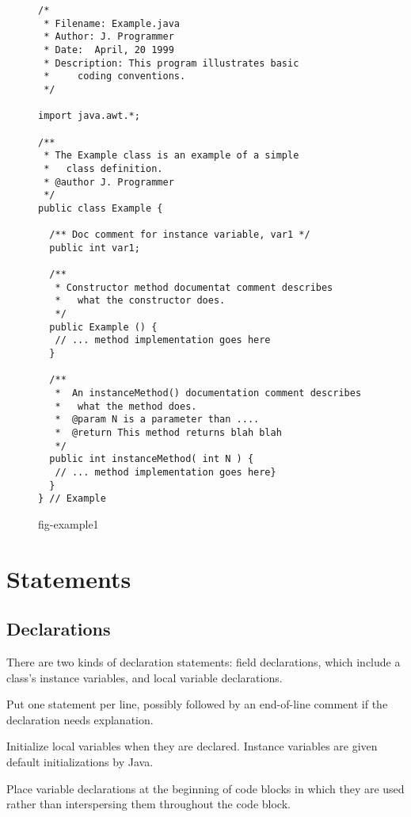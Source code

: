 \begin{figure}[tbhp]
\jjjprogstart
\begin{jjjlisting}
\begin{lstlisting}
/*
 * Filename: Example.java
 * Author: J. Programmer
 * Date:  April, 20 1999
 * Description: This program illustrates basic 
 *     coding conventions.
 */

import java.awt.*;

/**
 * The Example class is an example of a simple 
 *   class definition.
 * @author J. Programmer
 */
public class Example {

  /** Doc comment for instance variable, var1 */
  public int var1;

  /**
   * Constructor method documentat comment describes
   *   what the constructor does.
   */
  public Example () {
   // ... method implementation goes here
  }

  /**
   *  An instanceMethod() documentation comment describes
   *   what the method does.
   *  @param N is a parameter than ....
   *  @return This method returns blah blah
   */
  public int instanceMethod( int N ) {
   // ... method implementation goes here}
  }
} // Example
\end{lstlisting}
\end{jjjlisting}
{fig-example1}
\end{figure}


\section*{Statements}
\subsection*{Declarations}
\noindent There are two kinds of declaration statements: field declarations,
which include a class's instance variables, and local variable
declarations.

\begin{BL}
\item  Put one statement per line, possibly followed by an
end-of-line comment if the declaration needs explanation.

\item  Initialize local variables when they are declared.  Instance
variables are given default initializations by Java.

\item  Place variable declarations at the beginning of code blocks in which
they are used rather than interspersing them throughout the code
block.
\end{BL}




